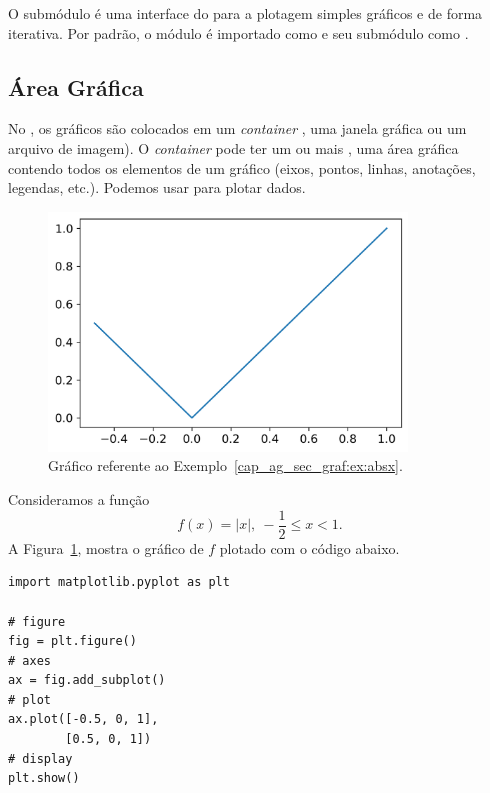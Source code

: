 O submódulo {\PYTHONmatplotlibDOTpyplot} é uma interface do {\PYTHONmatplotlib} para a plotagem simples gráficos e de forma iterativa. Por padrão, o módulo {\PYTHONmatplotlib} é importado como {\PYTHONmlp} e seu submódulo {\PYTHONmatplotlibDOTpyplot} como {\PYTHONplt}.

\subsection{Área Gráfica}

No {\PYTHONmatplotlib}, os gráficos são colocados em um \textit{container} {\PYTHONmatplotlibDOTfigureDOTFigure}, uma janela gráfica ou um arquivo de imagem). O \textit{container} pode ter um ou mais {\PYTHONmatplotlibDOTaxesDOTAxes}, uma área gráfica contendo todos os elementos de um gráfico (eixos, pontos, linhas, anotações, legendas, etc.). Podemos usar {\PYTHONmatplotlibDOTaxesDOTAxesDOTplot} para plotar dados.

\begin{figure}[H]
  \centering
  \includegraphics[width=3.75in]{./cap_ag/dados/fig_absx/fig.png}
  \caption{Gráfico referente ao Exemplo~\ref{cap_ag_sec_graf:ex:absx}.}
  \label{cap_ag_sec_graf:fig:absx}
\end{figure}


\begin{ex}\label{cap_ag_sec_graf:ex:absx}
  Consideramos a função
  \begin{equation}
    f(x) = |x|, ~-\frac{1}{2}\leq x < 1.
  \end{equation}
  A Figura~\ref{cap_ag_sec_graf:fig:absx}, mostra o gráfico de $f$ plotado com o código abaixo.
  
\begin{lstlisting}
import matplotlib.pyplot as plt

# figure
fig = plt.figure()
# axes
ax = fig.add_subplot()
# plot
ax.plot([-0.5, 0, 1],
        [0.5, 0, 1])
# display
plt.show()
\end{lstlisting}

\end{ex}

